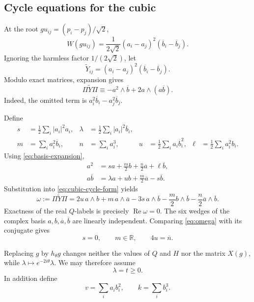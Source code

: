\documentclass[11pt,reqno]{amsart}
\theoremstyle{remark}
\newcommand{\R}{\mathbb R}
\newcommand{\abs}[1]{\left\lvert #1\right\rvert}
\begin{document}
\subsection{Cycle equations for the cubic}

At the root $gu_{ij}=(p_i-p_j)/\sqrt2$,
\[
W(gu_{ij})
=\frac1{2\sqrt2}(a_i-a_j)^2(\overline b_i-\overline b_j).
\]
Ignoring the harmless factor $1/(2\sqrt2)$, let
\[
\widetilde Y_{ij}=(a_i-a_j)^2(\overline b_i-\overline b_j).
\]
Modulo exact matrices, expansion gives
\begin{equation}\label{eq:cubic-cycle-form}
\Pi\widetilde Y\Pi
\equiv -a^2\wedge\overline b+2a\wedge(a\overline b).
\end{equation}
Indeed, the omitted term is
$a_i^2\overline b_i-a_j^2\overline b_j$.

Define
\begin{align}
s&=\frac12\sum_i\abs{a_i}^2a_i,
&\lambda&=\frac12\sum_i\abs{a_i}^2\overline b_i,\label{eq:s-lambda}\\
m&=\sum_i a_i^2\overline b_i,
&n&=\sum_i a_i^3,
&u&=\frac12\sum_i a_i\overline b_i^2,
&\ell&=\frac12\sum_i a_i^2b_i.\label{eq:m-n-u-ell}
\end{align}
Using \eqref{eq:basis-expansion},
\begin{align}
a^2&=sa+\frac m2b+\frac n2\overline a+\ell\overline b,
\label{eq:a2-expansion}\\
a\overline b&=\lambda a+ub+\frac m2\overline a-s\overline b.
\label{eq:abbar-expansion}
\end{align}
Substitution into \eqref{eq:cubic-cycle-form} yields
\begin{equation}\label{eq:omega}
\omega:=\Pi\widetilde Y\Pi
=2u\,a\wedge b
+m\,a\wedge\overline a
-3s\,a\wedge\overline b
-\frac m2b\wedge\overline b
-\frac n2\overline a\wedge\overline b.
\end{equation}
Exactness of the real $Q$-labels is precisely $\operatorname{Re}\omega=0$.
The six wedges of the complex basis $a,b,\overline a,\overline b$ are linearly
independent.  Comparing \eqref{eq:omega} with its conjugate gives
\begin{equation}\label{eq:cubic-exactness-conditions}
s=0,
\qquad m\in\R,
\qquad 4u=\overline n.
\end{equation}

Replacing $g$ by $h_\theta g$ changes neither the values of $Q$ and $H$ nor
the matrix $X(g)$, while
$\lambda\mapsto e^{-2i\theta}\lambda$.  We may therefore assume
\begin{equation}\label{eq:t-gauge}
\lambda=t\ge0.
\end{equation}
In addition define
\begin{equation}\label{eq:v-k}
v=\sum_i a_ib_i^2,
\qquad
k=\sum_i b_i^3.
\end{equation}
\end{document}
